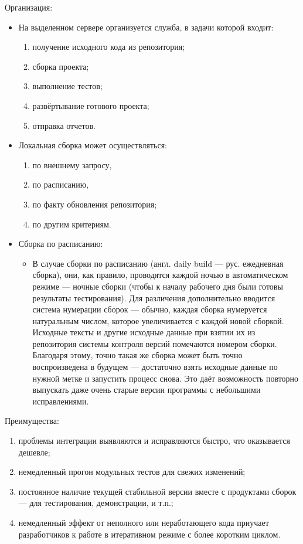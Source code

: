 \documentclass{article}
\begin{document}
    Организация:
    \begin{itemize}
        \item На выделенном сервере организуется служба, в задачи которой входит:
        \begin{enumerate}
            \item получение исходного кода из репозитория;
            \item сборка проекта;
            \item выполнение тестов;
            \item развёртывание готового проекта;
            \item отправка отчетов.
        \end{enumerate}

        \item Локальная сборка может осуществляться:
        \begin{enumerate}
            \item по внешнему запросу,
            \item по расписанию,
            \item по факту обновления репозитория;
            \item по другим критериям.
        \end{enumerate}

        \item Сборка по расписанию:
        \begin{itemize}
            \item В случае сборки по расписанию (англ. daily build — рус. ежедневная сборка), они, как правило, проводятся каждой ночью в автоматическом режиме — ночные сборки (чтобы к началу рабочего дня были готовы результаты тестирования). Для различения дополнительно вводится система нумерации сборок — обычно, каждая сборка нумеруется натуральным числом, которое увеличивается с каждой новой сборкой. Исходные тексты и другие исходные данные при взятии их из репозитория системы контроля версий помечаются номером сборки. Благодаря этому, точно такая же сборка может быть точно воспроизведена в будущем — достаточно взять исходные данные по нужной метке и запустить процесс снова. Это даёт возможность повторно выпускать даже очень старые версии программы с небольшими исправлениями.
        \end{itemize}
    \end{itemize}

    Преимущества:
    \begin{enumerate}
        \item проблемы интеграции выявляются и исправляются быстро, что оказывается дешевле;
        \item немедленный прогон модульных тестов для свежих изменений;
        \item постоянное наличие текущей стабильной версии вместе с продуктами сборок — для тестирования, демонстрации, и т.п.;
        \item немедленный эффект от неполного или неработающего кода приучает разработчиков к работе в итеративном режиме с более коротким циклом.
    \end{enumerate}
\end{document}
